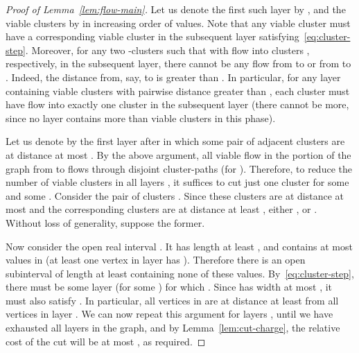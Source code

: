 \begin{proof}[Proof of Lemma~\ref{lem:flow-main}]
Let us denote the first such layer by , and the viable clusters by  in increasing order of  values. Note that any viable cluster  must have a corresponding viable cluster  in the subsequent layer satisfying~\eqref{eq:cluster-step}. Moreover, for any two -clusters  such that  with flow into clusters , respectively, in the subsequent layer, there cannot be any flow from  to  or from  to . Indeed, the distance from, say,   to  is greater than . In particular, for any layer containing  viable clusters with pairwise distance greater than , each cluster must have flow into exactly one cluster in the subsequent layer (there cannot be more, since no layer contains more than  viable clusters in this phase).

Let us denote by  the first layer after  in which some pair of adjacent clusters  are at distance at most . By the above argument, all viable flow in the portion of the graph from  to  flows through  disjoint cluster-paths  (for ). Therefore, to reduce the number of viable clusters in all layers , it suffices to cut just one cluster  for some  and some . Consider the pair of clusters . Since these clusters are at distance at most  and the corresponding clusters  are at distance at least , either , or . Without loss of generality, suppose the former.

Now consider the open real interval . It has length at least , and contains at most  values in  (at least one vertex  in layer  has ). Therefore there is an open subinterval  of length at least  containing none of these values. By~\eqref{eq:cluster-step}, there must be some layer  (for some ) for which . Since  has width at most , it must also satisfy . In particular, all vertices in  are at distance at least  from all vertices in layer . We can now repeat this argument for layers , until we have exhausted all layers in the graph, and by Lemma~\ref{lem:cut-charge}, the relative cost of the cut will be at most , as required.
\end{proof}

\fi

